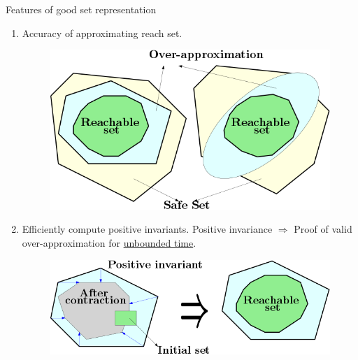 \begin{frame}{Features of good set representation}
\begin{enumerate}
\item
\begin{minipage}{0.4\textwidth}
{\color{blue} Accuracy} of approximating reach set.
\end{minipage}
%
\hfill\hfill
%
\begin{minipage}{0.5\textwidth}
\begin{figure}
\includegraphics[scale=0.3]{figures/accuracy-approximation.png}
\end{figure}
\end{minipage}
%
\pause
%
\item Efficiently compute {\color{blue} positive invariants}.
{\color{purple} Positive invariance $\Rightarrow$} Proof of
{\color{purple} valid over-approximation} for \underline{unbounded time}.
%
\begin{figure}
\includegraphics[scale=0.35]{figures/positive-invariant.png}
\end{figure}
%
\end{enumerate}
\end{frame}

